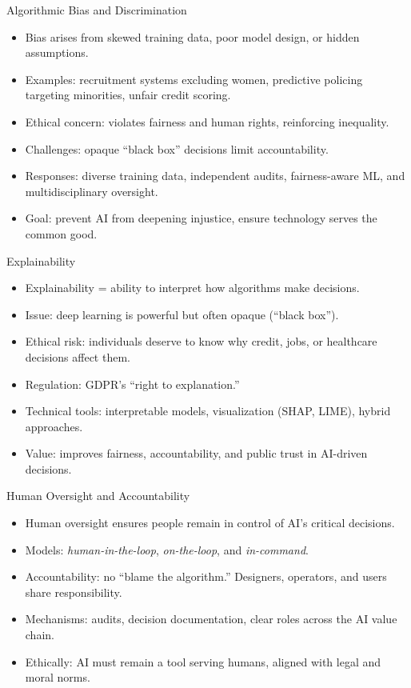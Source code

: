 \documentclass[aspectratio=169, table]{beamer}
\begin{document}
\begin{frame}{Algorithmic Bias and Discrimination}
	\vspace{20pt}
	\begin{itemize}
		\item Bias arises from skewed training data, poor model design, or hidden assumptions.  
		\item Examples: recruitment systems excluding women, predictive policing targeting minorities, unfair credit scoring.  
		\item Ethical concern: violates fairness and human rights, reinforcing inequality.  
		\item Challenges: opaque “black box” decisions limit accountability.  
		\item Responses: diverse training data, independent audits, fairness-aware ML, and multidisciplinary oversight.  
		\item Goal: prevent AI from deepening injustice, ensure technology serves the common good.  
	\end{itemize}
\end{frame}

\begin{frame}{Explainability}
	\vspace{20pt}
	\begin{itemize}
		\item Explainability = ability to interpret how algorithms make decisions.  
		\item Issue: deep learning is powerful but often opaque (“black box”).  
		\item Ethical risk: individuals deserve to know why credit, jobs, or healthcare decisions affect them.  
		\item Regulation: GDPR’s “right to explanation.”  
		\item Technical tools: interpretable models, visualization (SHAP, LIME), hybrid approaches.  
		\item Value: improves fairness, accountability, and public trust in AI-driven decisions.  
	\end{itemize}
\end{frame}

\begin{frame}{Human Oversight and Accountability}
	\vspace{20pt}
	\begin{itemize}
		\item Human oversight ensures people remain in control of AI’s critical decisions.  
		\item Models: \textit{human-in-the-loop}, \textit{on-the-loop}, and \textit{in-command}.  
		\item Accountability: no “blame the algorithm.” Designers, operators, and users share responsibility.  
		\item Mechanisms: audits, decision documentation, clear roles across the AI value chain.  
		\item Ethically: AI must remain a tool serving humans, aligned with legal and moral norms.  
	\end{itemize}
\end{frame}
\end{document}
